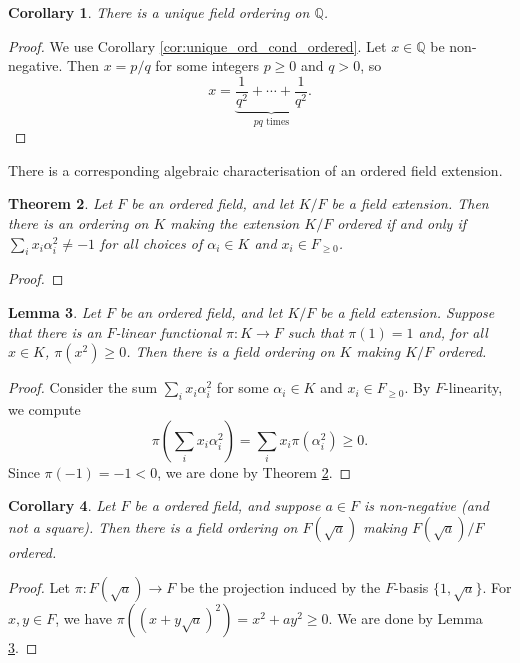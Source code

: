 \documentclass[a4paper]{report}
\newtheorem{theorem}{Theorem}
\newtheorem{lemma}[theorem]{Lemma}
\newtheorem{corollary}[theorem]{Corollary}
\theoremstyle{definition}
\newcommand\Q{\mathbb{Q}}
\begin{document}
\begin{corollary}
  \label{cor:unique_ord_Q}
  There is a unique field ordering on $\Q$.
\end{corollary}
\begin{proof}
  We use Corollary \ref{cor:unique_ord_cond_ordered}. Let $x\in\Q$ be non-negative. Then $x=p/q$ for some integers $p\geq0$ and $q>0$, so 
  \[x=\underbrace{\frac{1}{q^2}+\cdots+\frac{1}{q^2}}_{pq\text{ times}}.\]
\end{proof}

There is a corresponding algebraic characterisation of an ordered field extension.

\begin{theorem}
  \label{thm:ext_ord_cond}
  \leanok
  Let $F$ be an ordered field, and let $K/F$ be a field extension. Then there is an ordering on $K$ making the extension $K/F$ ordered if and only if $\sum_i x_i\alpha_i^2\neq-1$ for all choices of $\alpha_i\in K$ and $x_i\in F_{\geq0}$.
\end{theorem}
\begin{proof}
  \leanok
\end{proof}

\begin{lemma}
  \label{lem:ext_ord_functional_suff}
  Let $F$ be an ordered field, and let $K/F$ be a field extension. Suppose that there is an $F$-linear functional $\pi:K\to F$ such that $\pi(1)=1$ and, for all $x\in K$, $\pi(x^2)\geq0$. Then there is a field ordering on $K$ making $K/F$ ordered.
\end{lemma}
\begin{proof}
  Consider the sum $\sum_i x_i\alpha_i^2$ for some $\alpha_i\in K$ and $x_i\in F_{\geq0}$. By $F$-linearity, we compute
  \[\pi\left(\sum_i x_i\alpha_i^2\right)=\sum_i x_i\pi(\alpha_i^2)\geq0.\]
  Since $\pi(-1)=-1<0$, we are done by Theorem \ref{thm:ext_ord_cond}.
\end{proof}

\begin{corollary}
  \label{cor:ext_ord_to_adj_sqrt}
  Let $F$ be a ordered field, and suppose $a\in F$ is non-negative (and not a square). Then there is a field ordering on $F(\sqrt{a})$ making $F(\sqrt{a})/F$ ordered.
\end{corollary}
\begin{proof}
  Let $\pi:F(\sqrt{a})\to F$ be the projection induced by the $F$-basis $\{1,\sqrt{a}\}$. For $x,y\in F$, we have $\pi((x+y\sqrt{a})^2)=x^2+ay^2\geq0$. We are done by Lemma \ref{lem:ext_ord_functional_suff}.
\end{proof}
\end{document}

